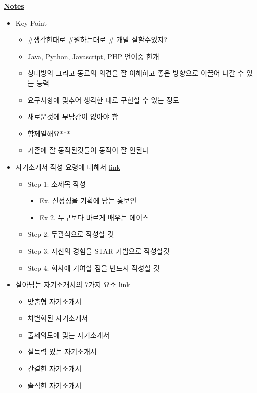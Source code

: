 \documentclass[12pt]{article}
\begin{document}
\underline{\textbf{Notes}}

\begin{itemize}
    \item Key Point
    \begin{itemize}
        \item \#생각한대로 \#원하는대로 \# 개발 잘할수있지?
        \item Java, Python, Javascript, PHP 언어중 한개
        \item 상대방의 그리고 동료의 의견을 잘 이해하고 좋은 방향으로 이끌어 나갈 수 있는 능력
        \item 요구사항에 맞추어 생각한 대로 구현할 수 있는 정도
        \item 새로운것에 부담감이 없아야 함
        \item 함께일해요***

        \item 기존에 잘 동작된것들이 동작이 잘 안된다

    \end{itemize}
    \item 자기소개서 작성 요령에 대해서 \href{https://brunch.co.kr/@hklim/11}{link}
    \begin{itemize}
        \item Step 1: 소제목 작성
        \begin{itemize}
            \item Ex. 진정성을 기휙에 담는 홍보인
            \item Ex 2. 누구보다 바르게 배우는 에이스
        \end{itemize}
        \item Step 2: 두괄식으로 작성할 것
        \item Step 3: 자신의 경험을 STAR 기법으로 작성할것
        \item Step 4: 회사에 기여할 점을 반드시 작성할 것
    \end{itemize}

    \bigskip
    \item 살아남는 자기소개서의 7가지 요소 \href{https://brunch.co.kr/@kuehyunpark/6}{link}
    \begin{itemize}
        \item 맞춤형 자기소개서
        \item 차별화된 자기소개서
        \item 출제의도에 맞는 자기소개서
        \item 설득력 있는 자기소개서
        \item 간결한 자기소개서
        \item 솔직한 자기소개서
    \end{itemize}

\end{itemize}
\end{document}
